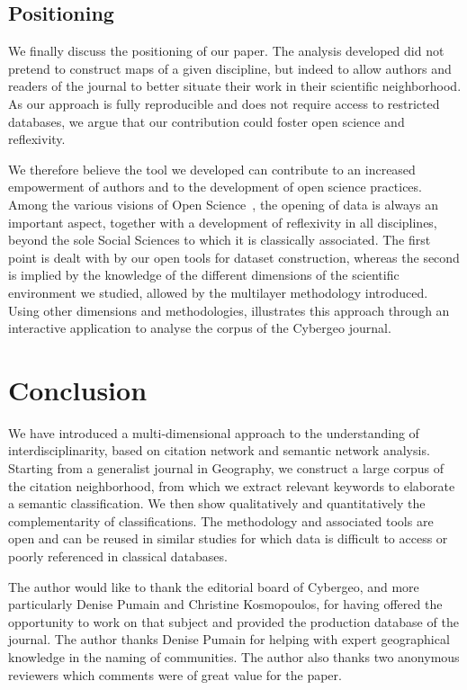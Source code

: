 \subsection*{Positioning}

We finally discuss the positioning of our paper. The analysis developed did not pretend to construct maps of a given discipline, but indeed to allow authors and readers of the journal to better situate their work in their scientific neighborhood. As our approach is fully reproducible and does not require access to restricted databases, we argue that our contribution could foster open science and reflexivity.

We therefore believe the tool we developed can contribute to an increased empowerment of authors and to the development of open science practices. Among the various visions of Open Science~\citep{fecher2014open}, the opening of data is always an important aspect, together with a development of reflexivity in all disciplines, beyond the sole Social Sciences to which it is classically associated. The first point is dealt with by our open tools for dataset construction, whereas the second is implied by the  knowledge of the different dimensions of the scientific environment we studied, allowed by the multilayer methodology introduced. Using other dimensions and methodologies, \cite{banos2018spatialised} illustrates this approach through an interactive application to analyse the corpus of the Cybergeo journal.





\section*{Conclusion}
\label{sec:discussion}


We have introduced a multi-dimensional approach to the understanding of interdisciplinarity, based on citation network and semantic network analysis. Starting from a generalist journal in Geography, we construct a large corpus of the citation neighborhood, from which we extract relevant keywords to elaborate a semantic classification. We then show qualitatively and quantitatively the complementarity of classifications. The methodology and associated tools are open and can be reused in similar studies for which data is difficult to access or poorly referenced in classical databases.




\begin{acknowledgements}
The author would like to thank the editorial board of Cybergeo, and more particularly Denise Pumain and Christine Kosmopoulos, for having offered the opportunity to work on that subject and provided the production database of the journal. The author thanks Denise Pumain for helping with expert geographical knowledge in the naming of communities. The author also thanks two anonymous reviewers which comments were of great value for the paper.
\end{acknowledgements}


